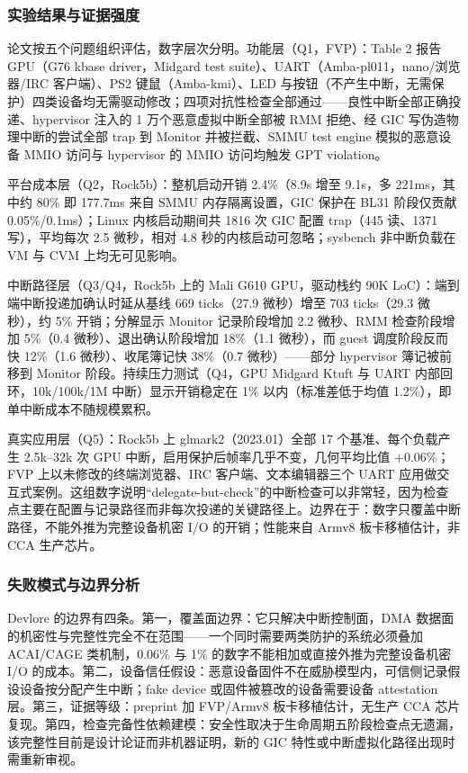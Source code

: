 \documentclass[11pt]{ctexart}
\begin{document}
\subsubsection{实验结果与证据强度}
论文按五个问题组织评估，数字层次分明。功能层（Q1，FVP）：Table 2 报告 GPU（G76 kbase driver，Midgard test suite）、UART（Amba-pl011，nano/浏览器/IRC 客户端）、PS2 键鼠（Amba-kmi）、LED 与按钮（不产生中断，无需保护）四类设备均无需驱动修改；四项对抗性检查全部通过——良性中断全部正确投递、hypervisor 注入的 1 万个恶意虚拟中断全部被 RMM 拒绝、经 GIC 写伪造物理中断的尝试全部 trap 到 Monitor 并被拦截、SMMU test engine 模拟的恶意设备 MMIO 访问与 hypervisor 的 MMIO 访问均触发 GPT violation。\par
平台成本层（Q2，Rock5b）：整机启动开销 2.4\%（8.9s 增至 9.1s，多 221ms，其中约 80\% 即 177.7ms 来自 SMMU 内存隔离设置，GIC 保护在 BL31 阶段仅贡献 0.05\%/0.1ms）；Linux 内核启动期间共 1816 次 GIC 配置 trap（445 读、1371 写），平均每次 2.5 微秒，相对 4.8 秒的内核启动可忽略；sysbench 非中断负载在 VM 与 CVM 上均无可见影响。\par
中断路径层（Q3/Q4，Rock5b 上的 Mali G610 GPU，驱动栈约 90K LoC）：端到端中断投递加确认时延从基线 669 ticks（27.9 微秒）增至 703 ticks（29.3 微秒），约 5\% 开销；分解显示 Monitor 记录阶段增加 2.2 微秒、RMM 检查阶段增加 5\%（0.4 微秒）、退出确认阶段增加 18\%（1.1 微秒），而 guest 调度阶段反而快 12\%（1.6 微秒）、收尾簿记快 38\%（0.7 微秒）——部分 hypervisor 簿记被前移到 Monitor 阶段。持续压力测试（Q4，GPU Midgard Ktuft 与 UART 内部回环，10k/100k/1M 中断）显示开销稳定在 1\% 以内（标准差低于均值 1.2\%），即单中断成本不随规模累积。\par
真实应用层（Q5）：Rock5b 上 glmark2（2023.01）全部 17 个基准、每个负载产生 2.5k--32k 次 GPU 中断，启用保护后帧率几乎不变，几何平均比值 +0.06\%；FVP 上以未修改的终端浏览器、IRC 客户端、文本编辑器三个 UART 应用做交互式案例。这组数字说明“delegate-but-check”的中断检查可以非常轻，因为检查点主要在配置与记录路径而非每次投递的关键路径上。边界在于：数字只覆盖中断路径，不能外推为完整设备机密 I/O 的开销；性能来自 Armv8 板卡移植估计，非 CCA 生产芯片。\par
\subsubsection{失败模式与边界分析}
Devlore 的边界有四条。第一，覆盖面边界：它只解决中断控制面，DMA 数据面的机密性与完整性完全不在范围——一个同时需要两类防护的系统必须叠加 ACAI/CAGE 类机制，0.06\% 与 1\% 的数字不能相加或直接外推为完整设备机密 I/O 的成本。第二，设备信任假设：恶意设备固件不在威胁模型内，可信侧记录假设设备按分配产生中断；fake device 或固件被篡改的设备需要设备 attestation 层。第三，证据等级：preprint 加 FVP/Armv8 板卡移植估计，无生产 CCA 芯片复现。第四，检查完备性依赖建模：安全性取决于生命周期五阶段检查点无遗漏，该完整性目前是设计论证而非机器证明，新的 GIC 特性或中断虚拟化路径出现时需重新审视。\par
\end{document}
